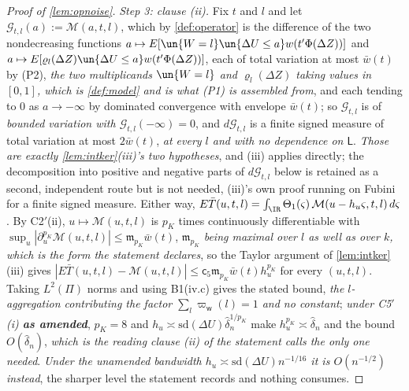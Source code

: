 \begin{proof}[Proof of \cref{lem:opnoise}]
\emph{Step 3: clause (ii).} Fix $t$ and $l$ and let $\mathcal G_{t,l}(a):=\mathcal M(a,t,l)$, which by
\cref{def:operator} is the difference of the two nondecreasing functions
$a\mapsto E[\un\{W=l\}\un\{\Delta U\le a\}w(t'\Phi(\Delta Z))]$ and
$a\mapsto E[\varrho_l(\Delta Z)\un\{\Delta U\le a\}w(t'\Phi(\Delta Z))]$, each of total variation at most
$\bar w(t)$ by (P2), \emph{the two multiplicands $\un\{W=l\}$ and $\varrho_l(\Delta Z)$ taking values
in $[0,1]$, which is \cref{def:model} and is what (P1) is assembled from}, and each tending to $0$ as
$a\to-\infty$ by dominated convergence with envelope
$\bar w(t)$; so $\mathcal G_{t,l}$ is of \emph{bounded variation with $\mathcal G_{t,l}(-\infty)=0$}, and
$d\mathcal G_{t,l}$ is a finite signed measure of total variation at most
$2\bar w(t)$, \emph{at every $l$ and with no dependence on $\mathsf L$}. \emph{Those are exactly
\cref{lem:intker}(iii)'s two hypotheses},
and (iii) applies directly; the decomposition into positive and negative parts of $d\mathcal G_{t,l}$ below
is retained as a second, independent route but is not needed, (iii)'s own proof running on
Fubini for a finite signed measure. Either way,
$E\bar T(u,t,l)=\int_\IR\Theta_1(\varsigma)\,\mathcal M(u-h_u\varsigma,t,l)\,d\varsigma$. By C2$'$(ii),
$u\mapsto\mathcal M(u,t,l)$ is $p_K$ times continuously differentiable with
$\sup_u|\partial_u^{p_K}\mathcal M(u,t,l)|\le\mathfrak m_{p_K}\bar w(t)$, \emph{$\mathfrak m_{p_K}$
being maximal over $l$ as well as over $k$, which is the form the statement declares}, so the Taylor
argument of \cref{lem:intker}(iii) gives
$|E\bar T(u,t,l)-\mathcal M(u,t,l)|\le\mathsf c_5\mathfrak m_{p_K}\bar w(t)h_u^{p_K}$ for every $(u,t,l)$.
Taking $L^{2}(\Pi)$ norms and using B1(iv.c) gives the stated bound, \emph{the $l$-aggregation
contributing the factor $\sum_l\varpi_{\mathsf w}(l)=1$ and no constant}; \emph{under C5$'$(i) \textbf{as
amended}}, $p_K=8$ and $h_u\asymp\mathrm{sd}(\Delta U)\hat\delta_n^{1/p_K}$ make $h_u^{p_K}\asymp\hat\delta_n$
and the bound $O(\hat\delta_n)$, \emph{which is the reading clause (ii) of the statement calls the only one
needed}. \emph{Under the unamended bandwidth $h_u\asymp\mathrm{sd}(\Delta U)n^{-1/16}$ it is $O(n^{-1/2})$
instead}, the sharper level the statement records and nothing consumes.


\end{proof}
